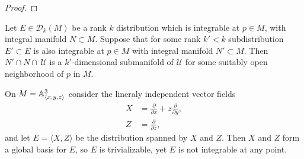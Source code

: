 \documentclass{lkx_paper}
\begin{document}
\begin{proof}

\end{proof}

\begin{proposition}
	Let $E\in \mathscr{D}_k(M)$ be a rank $k$ distribution which is integrable at $p\in M$, with integral manifold $N\subset M$. Suppose that for some rank $k'< k$ subdistribution $E'\subset E$ is also integrable at $p\in M$ with integral manifold $N'\subset M$. Then $N'\cap N \cap\, \mathcal{U}$ is a $k'$-dimensional submanifold of $\mathcal{U}$ for some suitably open neighborhood of $p$ in $M$.
\end{proposition}


\begin{example}
	On $M= \mathbb{A}^3_{\langle x,y,z\rangle}$ consider the lineraly independent vector fields
	\[
		\begin{aligned}
			X & = \frac{\partial}{\partial x} + z\frac{\partial}{\partial y}, \\
			Z & = \frac{\partial}{\partial z},
		\end{aligned}
	\]
	and let $E=\langle X, Z \rangle$ be the distribution spanned by $X$ and $Z$. Then $X$ and $Z$ form a global basis for $E$, so $E$ is trivializable, yet $E$ is not integrable at any point.

\end{example}
\end{document}
